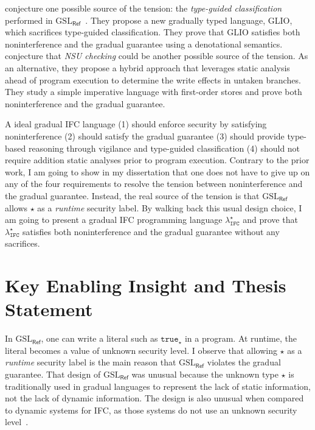 \documentclass[10pt, letterpaper]{article}
\newcommand{\Surface}{\ensuremath{\lambda_{\mathtt{IFC}}^\star}\xspace}
\newcommand{\GSLRef}{\ensuremath{\mathrm{GSL}_\mathsf{Ref}}\xspace}
\newcommand{\key}[1]{\ensuremath{\mathtt{#1}}}
\newcommand{\unk}{\key{\star}\xspace}
\newcommand{\true}{\key{true}}
\begin{document}
\citet{Amorim:2020aa} conjecture one possible source of the tension: the
\textit{type-guided classification} performed in
\GSLRef~\citep{Toro:2018aa}. They propose a new gradually typed language,
GLIO, which sacrifices type-guided classification. They prove that GLIO
satisfies both noninterference and the gradual guarantee using a denotational
semantics.
%
\citet{bichhawat2021gradual} conjecture that \textit{NSU checking} could be
another possible source of the tension. As an alternative, they propose a hybrid
approach that leverages static analysis ahead of program execution to determine
the write effects in untaken branches. They study a simple imperative language
with first-order stores and prove both noninterference and the gradual
guarantee.

A ideal gradual IFC language (1) should enforce security by
satisfying noninterference (2) should satisfy the gradual guarantee (3) should
provide type-based reasoning through vigilance and type-guided classification
(4) should not require addition static analyses prior to program execution.
Contrary to the prior work, I am going to show in my dissertation that one
does not have to give up on any of the four requirements to resolve the tension
between noninterference and the gradual guarantee. Instead, the real source of
the tension is that \GSLRef allows \unk as a \emph{runtime} security label. By
walking back this usual design choice, I am going to present a gradual
IFC programming language \Surface and prove that \Surface satisfies
both noninterference and the gradual guarantee without any sacrifices.

\section{Key Enabling Insight and Thesis Statement}
\label{sec:insight-and-statement}

In \GSLRef{}, one can write a literal such as $\true_{\unk}$ in a program. At
runtime, the literal becomes a value of unknown security level. I observe that
allowing \unk as a \emph{runtime} security label is the main reason that \GSLRef
violates the gradual guarantee. That design of \GSLRef was unusual because the
unknown type $\unk$ is traditionally used in gradual languages to represent the
lack of static information, not the lack of dynamic information. The design is
also unusual when compared to dynamic systems for IFC, as those systems do not
use an unknown security
level~\citep{Askarov:2009vq,austin2009efficient,Devriese:2010up,stefan2011flexible,Austin:2017uh}.
\end{document}
